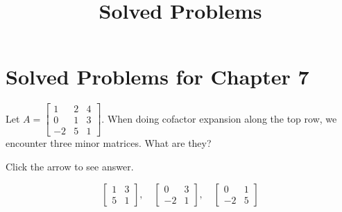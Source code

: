 \documentclass{ximera}
\title{Solved Problems} \license{CC BY-NC-SA 4.0}
\begin{document}
\begin{abstract}
\end{abstract}
\maketitle

\section*{Solved Problems for Chapter 7}

\begin{problem}\label{prb:7.2} Let $A = \left[ \begin{array}{rrr}
1 & 2 & 4 \\
0 & 1 & 3 \\
-2 & 5 & 1
\end{array} \right]$. When doing cofactor expansion along the top row, we encounter three minor matrices.  What are they?

Click the arrow to see answer.
\begin{expandable}{}{}
$$\begin{bmatrix}1&3\\5&1\end{bmatrix},\quad\begin{bmatrix}0&3\\-2&1\end{bmatrix},\quad\begin{bmatrix}0&1\\-2&5\end{bmatrix}$$
\end{expandable}
\end{problem}
\end{document}
